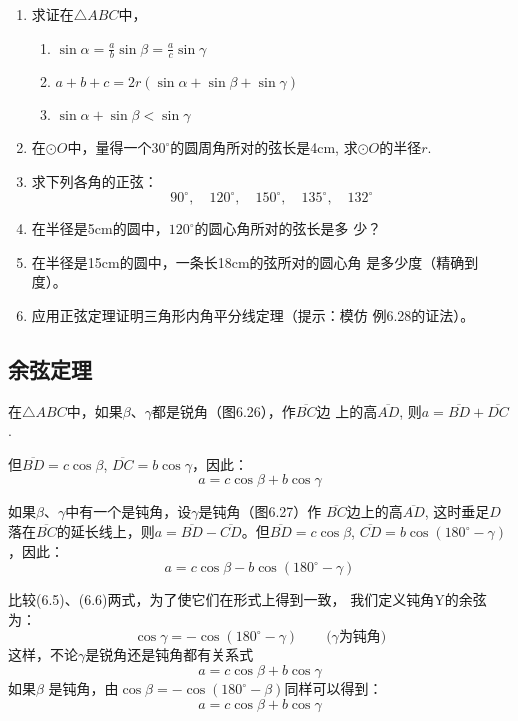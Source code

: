 \begin{ex}
\begin{enumerate}
    \item 求证在$\triangle ABC$中，
\begin{enumerate}
    \item $\sin\alpha=\frac{a}{b}\sin\beta=\frac{a}{c}\sin\gamma$
    \item $a+b+c=2r(\sin\alpha +\sin\beta+\sin\gamma)$
    \item $\sin\alpha+\sin\beta<\sin\gamma$
\end{enumerate}

\item 在$\odot O$中，量得一个$30^{\circ}$的圆周角所对的弦长是4cm,
求$\odot O$的半径$r$.
\item 求下列各角的正弦：
\[90^{\circ},\quad 120^{\circ},\quad 150^{\circ},\quad 135^{\circ},\quad 132^{\circ}\]
\item 在半径是5cm的圆中，$120^{\circ}$的圆心角所对的弦长是多
少？
\item 在半径是15cm的圆中，一条长18cm的弦所对的圆心角
是多少度（精确到度）。
\item 应用正弦定理证明三角形内角平分线定理（提示：模仿
例6.28的证法）。
\end{enumerate}
\end{ex}

\subsection{余弦定理}
在$\triangle ABC$中，如果$\beta$、$\gamma$都是锐角（图6.26），作$\overline{BC}$边
上的高$\overline{AD}$, 则$a=\overline{BD}+\overline{DC}$.

但$\overline{BD}=c\cos\beta$, $\overline{DC}=b\cos\gamma$，因此：
\begin{equation}
    a=c\cos\beta+b\cos\gamma
\end{equation}

如果$\beta$、$\gamma$中有一个是钝角，设$\gamma$是钝角（图6.27）作
$\overline{BC}$边上的高$\overline{AD}$, 这时垂足$D$落在$\overline{BC}$的延长线上，则$a=\overline{BD}-\overline{CD}$。但$\overline{BD}=c\cos\beta$, $\overline{CD}=b\cos(180^{\circ}-\gamma)$，因此：
\begin{equation}
    a=c\cos\beta -b\cos(180^{\circ}-\gamma)
\end{equation}

比较(6.5)、(6.6)两式，为了使它们在形式上得到一致，
我们定义钝角Y的余弦为：
\[\cos\gamma=-\cos(180^{\circ}-\gamma)\qquad \text{($\gamma$为钝角)}\]
这样，不论$\gamma$是锐角还是钝角都有关系式
\[a=c\cos\beta +b\cos\gamma\]
如果$\beta$ 是钝角，由$\cos\beta =-\cos(180^{\circ}-\beta )$同样可以得到：
\[a=c\cos\beta +b\cos\gamma\]

